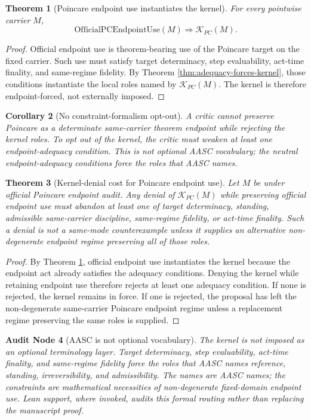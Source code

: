 \documentclass[11pt]{article}
\newtheorem{theorem}{Theorem}[section]
\newtheorem{corollary}[theorem]{Corollary}
\newtheorem{audit}[theorem]{Audit Node}
\newcommand{\KPC}{\mathcal{K}_{PC}}
\newcommand{\OfficialPCEndpointUse}{\mathrm{OfficialPCEndpointUse}}
\begin{document}
\begin{theorem}[Poincare endpoint use instantiates the kernel]\label{thm:endpoint-use-kernel}
For every pointwise carrier \(M\),
\[
\OfficialPCEndpointUse(M)\Rightarrow \KPC(M).
\]
\end{theorem}
\begin{proof}
Official endpoint use is theorem-bearing use of the Poincare target on the fixed carrier. Such use must satisfy target determinacy, step evaluability, act-time finality, and same-regime fidelity. By Theorem \ref{thm:adequacy-forces-kernel}, those conditions instantiate the local roles named by \(\KPC(M)\). The kernel is therefore endpoint-forced, not externally imposed.
\end{proof}

\begin{corollary}[No constraint-formalism opt-out]\label{cor:no-constraint-optout}
A critic cannot preserve Poincare as a determinate same-carrier theorem endpoint while rejecting the kernel roles. To opt out of the kernel, the critic must weaken at least one endpoint-adequacy condition. This is not optional AASC vocabulary; the neutral endpoint-adequacy conditions force the roles that AASC names.
\end{corollary}

\begin{theorem}[Kernel-denial cost for Poincare endpoint use]\label{thm:kernel-denial-cost}
Let \(M\) be under official Poincare endpoint audit. Any denial of \(\KPC(M)\) while preserving official endpoint use must abandon at least one of target determinacy, standing, admissible same-carrier discipline, same-regime fidelity, or act-time finality. Such a denial is not a same-mode counterexample unless it supplies an alternative non-degenerate endpoint regime preserving all of those roles.
\end{theorem}
\begin{proof}
By Theorem \ref{thm:endpoint-use-kernel}, official endpoint use instantiates the kernel because the endpoint act already satisfies the adequacy conditions. Denying the kernel while retaining endpoint use therefore rejects at least one adequacy condition. If none is rejected, the kernel remains in force. If one is rejected, the proposal has left the non-degenerate same-carrier Poincare endpoint regime unless a replacement regime preserving the same roles is supplied.
\end{proof}

\begin{audit}[AASC is not optional vocabulary]\label{audit:not-optional-vocab}
The kernel is not imposed as an optional terminology layer. Target determinacy, step evaluability, act-time finality, and same-regime fidelity force the roles that AASC names reference, standing, irreversibility, and admissibility. The names are AASC names; the constraints are mathematical necessities of non-degenerate fixed-domain endpoint use. Lean support, where invoked, audits this formal routing rather than replacing the manuscript proof.
\end{audit}
\end{document}
